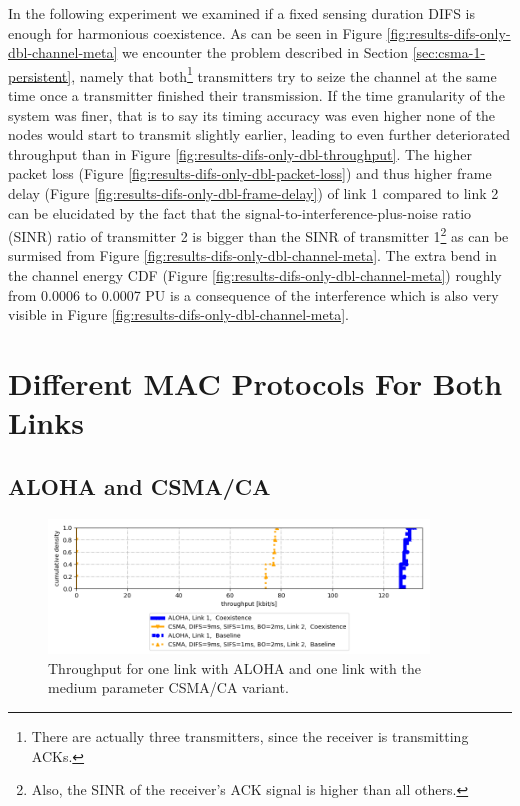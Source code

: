 In the following experiment we examined if a fixed sensing duration DIFS is enough for harmonious coexistence. As can be seen in Figure \ref{fig:results-difs-only-dbl-channel-meta} we encounter the problem described in Section \ref{sec:csma-1-persistent}, namely that both\footnote{There are actually three transmitters, since the receiver is transmitting ACKs.} transmitters try to seize the channel at the same time once a transmitter finished their transmission. If the time granularity of the system was finer, that is to say its timing accuracy was even higher none of the nodes would start to transmit slightly earlier, leading to even further deteriorated throughput than in Figure \ref{fig:results-difs-only-dbl-throughput}. The higher packet loss (Figure \ref{fig:results-difs-only-dbl-packet-loss}) and thus higher frame delay (Figure \ref{fig:results-difs-only-dbl-frame-delay}) of link 1 compared to link 2  can be elucidated by the fact that the signal-to-interference-plus-noise ratio (SINR) ratio of transmitter 2 is bigger than the SINR of transmitter 1\footnote{Also, the SINR of the receiver's ACK signal is higher than all others.} as can be surmised from Figure \ref{fig:results-difs-only-dbl-channel-meta}. The extra bend in the channel energy CDF (Figure \ref{fig:results-difs-only-dbl-channel-meta}) roughly from 0.0006 to 0.0007 PU is a consequence of the interference which is also very visible in Figure \ref{fig:results-difs-only-dbl-channel-meta}.

\clearpage

\section{Different MAC Protocols For Both Links}
\label{sec:different-protocols}

\subsection{ALOHA and CSMA/CA}
\label{sec:aloha-csma}

\begin{figure}[tb]
	\label{fig:results-aloha-csma-throughput}
	\begin{center}
		\includegraphics[width=0.9\textwidth]{pictures/results/different_combinations/aloha_csma/throughput_cdf}
	\end{center}
	\caption{Throughput for one link with ALOHA and one link with the medium parameter CSMA/CA variant.}
\end{figure}

